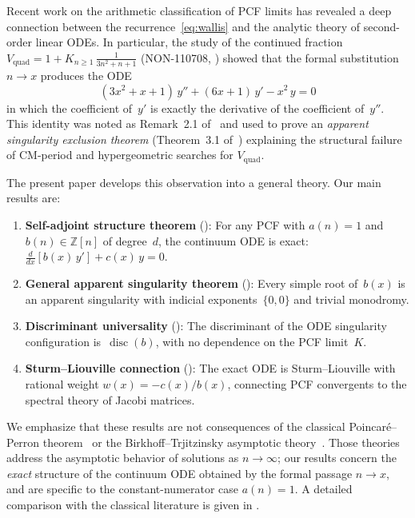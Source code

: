 \documentclass[11pt,a4paper]{amsart}
\theoremstyle{plain}
\theoremstyle{definition}
\theoremstyle{remark}
\newcommand{\Z}{\mathbb{Z}}
\newcommand{\disc}{\operatorname{disc}}
\newcommand{\Vquad}{V_{\mathrm{quad}}}
\begin{document}
Recent work on the arithmetic classification of PCF limits has
revealed a deep connection between the recurrence~\eqref{eq:wallis}
and the analytic theory of second-order linear ODEs.  In particular,
the study of the continued fraction
$\Vquad = 1 + K_{n\ge 1}\,\frac{1}{3n^2+n+1}$
(NON-110708, \cite{Vquad}) showed that the formal substitution
$n\to x$ produces the ODE
\begin{equation}\label{eq:vquad-ode}
  (3x^2+x+1)\,y'' + (6x+1)\,y' - x^2\,y = 0
\end{equation}
in which the coefficient of~$y'$ is exactly the derivative of the
coefficient of~$y''$.  This identity was noted as Remark~2.1
of~\cite{Vquad} and used to prove an \emph{apparent singularity
exclusion theorem} (Theorem~3.1 of~\cite{Vquad}) explaining the
structural failure of CM-period and hypergeometric searches for
$\Vquad$.

The present paper develops this observation into a general theory.
Our main results are:

\begin{enumerate}[label=(\roman*)]
\item \textbf{Self-adjoint structure theorem}
  (): For any PCF with $a(n)=1$ and
  $b(n)\in\Z[n]$ of degree~$d$, the continuum ODE is exact:
  $\tfrac{d}{dx}[b(x)\,y'] + c(x)\,y = 0$.
\item \textbf{General apparent singularity theorem}
  (): Every simple root of~$b(x)$ is an
  apparent singularity with indicial exponents~$\{0,0\}$ and
  trivial monodromy.
\item \textbf{Discriminant universality}
  (): The discriminant of the ODE singularity
  configuration is~$\disc(b)$, with no dependence on the PCF
  limit~$K$.
\item \textbf{Sturm--Liouville connection}
  (): The exact ODE is Sturm--Liouville with
  rational weight $w(x) = -c(x)/b(x)$, connecting PCF convergents
  to the spectral theory of Jacobi matrices.
\end{enumerate}

We emphasize that these results are not consequences of the
classical Poincar\'e--Perron theorem~\cite{Poincare85,Perron57}
or the Birkhoff--Trjitzinsky asymptotic
theory~\cite{Birkhoff30,BirkhoffTrjitzinsky32}.
Those theories address the asymptotic behavior of solutions as
$n\to\infty$; our results concern the \emph{exact} structure of
the continuum ODE obtained by the formal passage $n\to x$, and
are specific to the constant-numerator case $a(n)=1$.
A detailed comparison with the classical literature is given in
.
\end{document}
